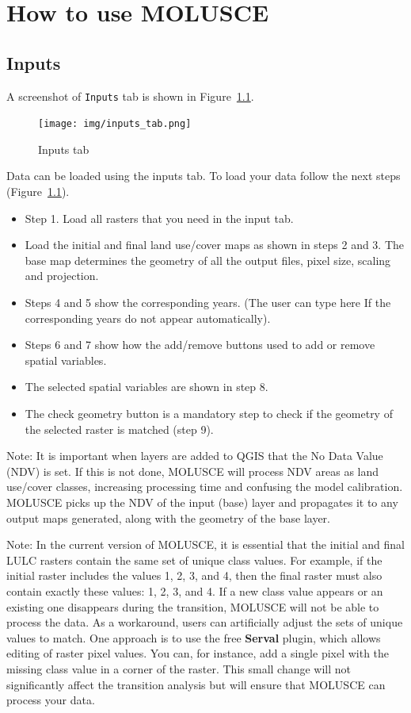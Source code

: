 \documentclass{report}
\begin{document}
\chapter{How to use MOLUSCE}

\section{Inputs}
A screenshot of \verb+Inputs+ tab is shown in Figure~\ref{fig:inputs_tab}.

\begin{figure}[h!]
\centering
\texttt{[image: img/inputs\_tab.png]}
\caption{Inputs tab}
\label{fig:inputs_tab}
\end{figure}

Data can be loaded using the inputs tab. To load your data follow the next steps (Figure~\ref{fig:inputs_tab}).

\begin{itemize}

  \item Step 1. Load all rasters that you need in the input tab. 
  \item Load the initial and final land use/cover maps as shown in steps 2 and 3. The base map determines
  the geometry of all the output files, pixel size, scaling and projection.
  \item Steps 4 and 5 show the corresponding years. (The user can type here If the corresponding years do
  not appear automatically).
  \item Steps 6 and 7 show how the add/remove buttons used to add or remove spatial variables.
  \item The selected spatial variables are shown in step 8.
  \item The check geometry button is a mandatory step to check if the geometry of the selected raster is
  matched (step 9).
\end{itemize}


Note: It is important when layers are added to QGIS that the No Data Value (NDV) is set. If this is
not done, MOLUSCE will process NDV areas as land use/cover classes, increasing processing time
and confusing the model calibration. MOLUSCE picks up the NDV of the input (base) layer and
propagates it to any output maps generated, along with the geometry of the base layer.\bigskip

Note: In the current version of MOLUSCE, it is essential that the initial and final LULC rasters contain the same set of unique class values. For example, if the initial raster includes the values 1, 2, 3, and 4, then the final raster must also contain exactly these values: 1, 2, 3, and 4. If a new class value appears or an existing one disappears during the transition, MOLUSCE will not be able to process the data. As a workaround, users can artificially adjust the sets of unique values to match. One approach is to use the free \textbf{Serval} plugin, which allows editing of raster pixel values. You can, for instance, add a single pixel with the missing class value in a corner of the raster. This small change will not significantly affect the transition analysis but will ensure that MOLUSCE can process your data.
\end{document}
